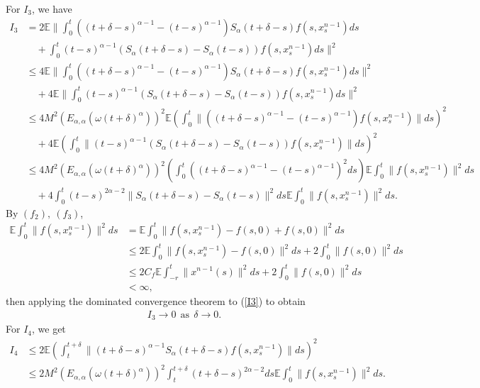 \documentclass[12pt,a4paper,oneside,reqno,notitlepage]{amsart}
\theoremstyle{plain}
\numberwithin{equation}{section}
\begin{document}
For $I_{3}$, we have
\begin{align}\label{I3}
I_{3}&=2\mathbb{E}\|\int_{0}^{t}((t+\delta-s)^{\alpha-1}-(t-s)^{\alpha-1})S_{\alpha}(t+\delta-s)f(s,x^{n-1}_{s})ds\nonumber\\
&\quad+\int_{0}^{t}(t-s)^{\alpha-1}(S_{\alpha}(t+\delta-s)-S_{\alpha}(t-s))f(s,x^{n-1}_{s})ds\|^{2}\nonumber\\
&\leq 4\mathbb{E}\|\int_{0}^{t}((t+\delta-s)^{\alpha-1}-(t-s)^{\alpha-1})S_{\alpha}(t+\delta-s)f(s,x^{n-1}_{s})ds\|^{2}\nonumber\\
&\quad+4\mathbb{E}\|\int_{0}^{t}(t-s)^{\alpha-1}(S_{\alpha}(t+\delta-s)-S_{\alpha}(t-s))f(s,x^{n-1}_{s})ds\|^{2}\nonumber\\
&\leq 4M^{2}(E_{\alpha,\alpha}(\omega(t+\delta)^{\alpha}))^{2}\mathbb{E}\left(\int_{0}^{t}\|((t+\delta-s)^{\alpha-1}-(t-s)^{\alpha-1})f(s,x^{n-1}_{s})\|ds\right)^{2}\nonumber\\
&\quad+4\mathbb{E}\left(\int_{0}^{t}\|(t-s)^{\alpha-1}(S_{\alpha}(t+\delta-s)-S_{\alpha}(t-s))f(s,x^{n-1}_{s})\|ds\right)^{2}\nonumber\\
&\leq4M^{2}(E_{\alpha,\alpha}(\omega(t+\delta)^{\alpha}))^{2}\left(\int_{0}^{t}((t+\delta-s)^{\alpha-1}-(t-s)^{\alpha-1})^{2}ds\right)\mathbb{E}\int_{0}^{t}\|f(s,x^{n-1}_{s})\|^{2}ds\nonumber\\
&\quad+4\int_{0}^{t}(t-s)^{2\alpha-2}\|S_{\alpha}(t+\delta-s)-S_{\alpha}(t-s)\|^{2}ds\mathbb{E}\int_{0}^{t}\|f(s,x^{n-1}_{s})\|^{2}ds.
\end{align}
By $(f_{2}), \ (f_{3})$,
\begin{align}\label{expect}
\mathbb{E}\int_{0}^{t}\|f(s,x^{n-1}_{s})\|^{2}ds&=\mathbb{E}\int_{0}^{t}\|f(s,x^{n-1}_{s})-f(s,0)+f(s,0)\|^{2}ds\nonumber\\
&\leq 2\mathbb{E}\int_{0}^{t}\|f(s,x^{n-1}_{s})-f(s,0)\|^{2}ds+2\int_{0}^{t}\|f(s,0)\|^{2}ds\nonumber\\
&\leq 2C_{f}\mathbb{E}\int_{-r}^{t}\|x^{n-1}(s)\|^{2}ds+2\int_{0}^{t}\|f(s,0)\|^{2}ds\nonumber\\
&<\infty,
\end{align}
then applying the dominated convergence theorem to (\ref{I3}) to obtain
\begin{align}\label{dom}
I_{3}\rightarrow 0 \ \ \mbox{as} \ \ \delta\rightarrow 0.
\end{align}
For $I_{4}$, we get
\begin{align}\label{second}
I_{4}&\leq 2\mathbb{E}\left(\int_{t}^{t+\delta}\|(t+\delta-s)^{\alpha-1}S_{\alpha}(t+\delta-s)f(s,x^{n-1}_{s})\|ds\right)^{2}\nonumber\\
&\leq 2M^{2}(E_{\alpha,\alpha}(\omega(t+\delta)^{\alpha}))^{2}\int_{t}^{t+\delta}(t+\delta-s)^{2\alpha-2}ds\mathbb{E}\int_{0}^{t}\|f(s,x^{n-1}_{s})\|^{2}ds.
\end{align}
\end{document}
